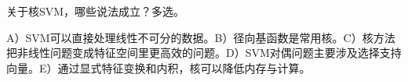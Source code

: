 关于核SVM，哪些说法成立？多选。


A）SVM可以直接处理线性不可分的数据。B）径向基函数是常用核。C）核方法把非线性问题变成特征空间里更高效的问题。D）SVM对偶问题主要涉及选择支持向量。E）通过显式特征变换和内积，核可以降低内存与计算。
